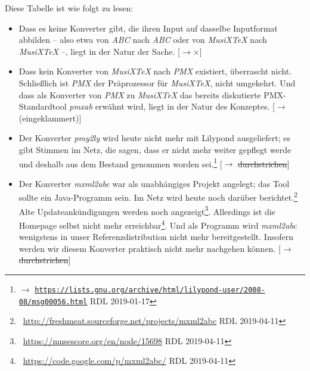 Diese Tabelle ist wie folgt zu lesen:

\begin{itemize}
  \item Dass es keine Konverter gibt, die ihren Input auf dasselbe Inputformat
  abbilden -- also etwa von \textit{ABC} nach \textit{ABC} oder von
  \textit{MusiX\TeX} nach \textit{MusiX\-\TeX} --, liegt in der Natur der Sache.
  [$\rightarrow \times$]
  \item Dass kein Konverter von \textit{MusiX\TeX} nach \textit{PMX} existiert,
  überrascht nicht. Schließlich ist \textit{PMX} der Präprozessor für
  \textit{MusiX\TeX}, nicht umgekehrt. Und dass als Konverter von \textit{PMX}
  zu \textit{MusiX\TeX} das bereits diskutierte PMX-Standardtool \textit{pmxab}
  erwähnt wird, liegt in der Natur des Konzeptes. [$\rightarrow$
  (eingeklammert)]
  \item Der Konverter \textit{pmy2ly} wird heute nicht mehr mit Lilypond
  ausgeliefert; es gibt Stimmen im Netz, die sagen, dass er nicht mehr weiter
  gepflegt werde und deshalb aus dem Bestand genommen worden sei.\footnote{$\rightarrow$
  \href{https://lists.gnu.org/archive/html/lilypond-user/2008-08/msg00056.html}{
  \texttt{https://lists.gnu.org/archive/html/lilypond-user/2008-08/msg00056.html}}
  RDL 2019-01-17} [$\rightarrow$ \sout{durchstrichen}]

  \item Der Konverter \textit{mxml2abc} war als unabhängiges Projekt angelegt;
  das Tool sollte ein Java-Programm sein. Im Netz wird heute noch darüber
  berichtet.\footnote{\ra\
  \href{http://freshmeat.sourceforge.net/projects/mxml2abc}
  {http://freshmeat.sourceforge.net/projects/mxml2abc} RDL 2019-04-11} Alte
  Updateankündigungen werden noch angezeigt\footnote{\ra\ 
  \href{https://musescore.org/en/node/15698}
  {https://musescore.org/en/node/15698} RDL 2019-04-11}. Allerdings ist die
  Homepage selbst nicht mehr
  erreichbar\footnote{\ra\ \href{https://code.google.com/p/mxml2abc/}
  {https://code.google.com/p/mxml2abc/} RDL 2019-04-11}.
  Und als Programm wird \textit{mxml2abc} wenigstens in unser
  Referenzdistribution nicht mehr bereitgestellt. Insofern werden wir diesem
  Konverter praktisch nicht mehr nachgehen können. [$\rightarrow$
  \sout{durchstrichen}]


\end{itemize}
